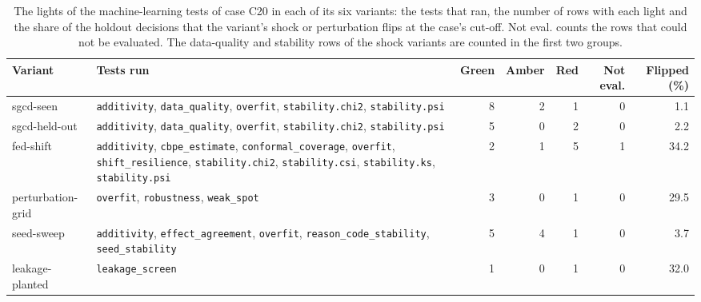 \begin{table}[htbp]
\centering
\setlength{\tabcolsep}{3pt}
\footnotesize
\caption{The lights of the machine-learning tests of case C20 in each of its six variants: the tests that ran, the number of rows with each light and the share of the holdout decisions that the variant's shock or perturbation flips at the case's cut-off. Not eval. counts the rows that could not be evaluated. The data-quality and stability rows of the shock variants are counted in the first two groups.}
\label{tab:vt-c20-lights}
\begin{tabular}{lp{4.2cm}rrrrr}
\toprule
Variant & Tests run & Green & Amber & Red & Not eval. & Flipped (\%) \\
\midrule
sgcd-seen & \nolinkurl{additivity}, \nolinkurl{data_quality}, \nolinkurl{overfit}, \nolinkurl{stability.chi2}, \nolinkurl{stability.psi} & 8 & 2 & 1 & 0 & 1.1 \\
sgcd-held-out & \nolinkurl{additivity}, \nolinkurl{data_quality}, \nolinkurl{overfit}, \nolinkurl{stability.chi2}, \nolinkurl{stability.psi} & 5 & 0 & 2 & 0 & 2.2 \\
fed-shift & \nolinkurl{additivity}, \nolinkurl{cbpe_estimate}, \nolinkurl{conformal_coverage}, \nolinkurl{overfit}, \nolinkurl{shift_resilience}, \nolinkurl{stability.chi2}, \nolinkurl{stability.csi}, \nolinkurl{stability.ks}, \nolinkurl{stability.psi} & 2 & 1 & 5 & 1 & 34.2 \\
perturbation-grid & \nolinkurl{overfit}, \nolinkurl{robustness}, \nolinkurl{weak_spot} & 3 & 0 & 1 & 0 & 29.5 \\
seed-sweep & \nolinkurl{additivity}, \nolinkurl{effect_agreement}, \nolinkurl{overfit}, \nolinkurl{reason_code_stability}, \nolinkurl{seed_stability} & 5 & 4 & 1 & 0 & 3.7 \\
leakage-planted & \nolinkurl{leakage_screen} & 1 & 0 & 1 & 0 & 32.0 \\
\bottomrule
\end{tabular}
\end{table}
